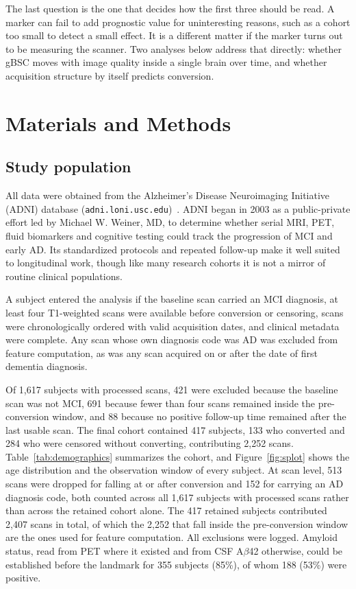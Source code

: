 \documentclass[blue]{ludusofficial}  %
\begin{document}
The last question is the one that decides how the first three should be read. A marker can fail to add prognostic value for uninteresting reasons, such as a cohort too small to detect a small effect. It is a different matter if the marker turns out to be measuring the scanner. Two analyses below address that directly: whether gBSC moves with image quality inside a single brain over time, and whether acquisition structure by itself predicts conversion.

\section{Materials and Methods}

\subsection{Study population}

All data were obtained from the Alzheimer's Disease Neuroimaging Initiative (ADNI) database (\texttt{adni.loni.usc.edu})~\cite{weiner2010adni,petersen2010adni}. ADNI began in 2003 as a public-private effort led by Michael W. Weiner, MD, to determine whether serial MRI, PET, fluid biomarkers and cognitive testing could track the progression of MCI and early AD. Its standardized protocols and repeated follow-up make it well suited to longitudinal work, though like many research cohorts it is not a mirror of routine clinical populations.

A subject entered the analysis if the baseline scan carried an MCI diagnosis, at least four T1-weighted scans were available before conversion or censoring, scans were chronologically ordered with valid acquisition dates, and clinical metadata were complete. Any scan whose own diagnosis code was AD was excluded from feature computation, as was any scan acquired on or after the date of first dementia diagnosis.

Of 1,617 subjects with processed scans, 421 were excluded because the baseline scan was not MCI, 691 because fewer than four scans remained inside the pre-conversion window, and 88 because no positive follow-up time remained after the last usable scan. The final cohort contained 417 subjects, 133 who converted and 284 who were censored without converting, contributing 2,252 scans. Table~\ref{tab:demographics} summarizes the cohort, and Figure~\ref{fig:splot} shows the age distribution and the observation window of every subject. At scan level, 513 scans were dropped for falling at or after conversion and 152 for carrying an AD diagnosis code, both counted across all 1,617 subjects with processed scans rather than across the retained cohort alone. The 417 retained subjects contributed 2,407 scans in total, of which the 2,252 that fall inside the pre-conversion window are the ones used for feature computation. All exclusions were logged. Amyloid status, read from PET where it existed and from CSF A$\beta$42 otherwise, could be established before the landmark for 355 subjects (85\%), of whom 188 (53\%) were positive.
\end{document}
